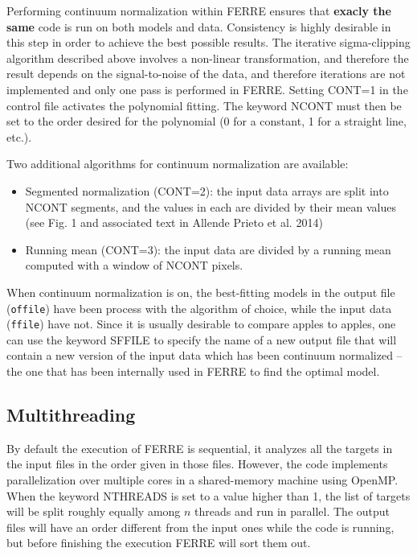 \documentclass[12pt]{article}
\begin{document}
Performing continuum normalization within FERRE ensures that {\bf exacly the same} 
code is run on both models and data.
Consistency is highly desirable in this step in order to achieve the best possible results.
The iterative sigma-clipping algorithm described above involves a non-linear transformation,
and therefore the result depends on the signal-to-noise of the data, and therefore 
iterations are not implemented and only one pass is performed in FERRE. 
Setting CONT=1 in the control file activates the polynomial fitting. The keyword NCONT 
must then be set to the order desired for the polynomial (0 for a constant, 
1 for a straight line, etc.). 

Two additional algorithms for continuum normalization are available:
\begin{itemize}
\item Segmented normalization (CONT=2): the input data arrays are split into NCONT segments, 
and the values in each are divided by their mean values (see Fig. 1 and associated text in 
Allende Prieto et al. 2014)
\item Running mean (CONT=3): the input data are divided by a running mean computed with a window of NCONT pixels.
\end{itemize}

When continuum normalization is on, the best-fitting models in the output file ({\tt offile})
have been process with the algorithm of choice, while the input data ({\tt ffile}) have not.
Since it is usually desirable to compare apples to apples, one can use the keyword 
SFFILE to specify the name of a new output file that will contain a new version of the input data
which has been continuum normalized -- the one that has been internally used in FERRE to 
find the optimal model.


\subsection{Multithreading}

By default the execution of FERRE is sequential, it analyzes all the targets in 
the input files in the order given in those files. However, the code implements 
parallelization over multiple cores in a shared-memory machine using OpenMP.
When the keyword NTHREADS is set to a value higher than 1, the list of targets
will be split roughly equally among $n$ threads and run in parallel. The output
files will have an order different from the input ones while the code is running,
but before finishing the execution FERRE will sort them out.
\end{document}
